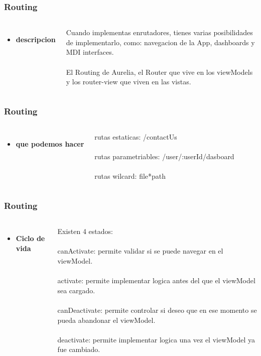 \documentclass{beamer}
\begin{document}
\begin{frame}
\frametitle{Routing}
\begin{columns}[c]
\begin{itemize}
\item \textbf{descripcion}
\end{itemize}

Cuando implementas enrutadores, tienes varias posibilidades de implementarlo, como: navegacion de la App, dashboards y MDI interfaces.
\\~\\
El Routing de Aurelia, el Router que vive en los viewModels y los router-view que viven en las vistas.
\end{columns}
\end{frame}
\begin{frame}
\frametitle{Routing}
\begin{columns}[c]
\begin{itemize}
\item \textbf{que podemos hacer}
\end{itemize}

rutas estaticas: /contactUs
\\~\\
rutas parametriables: /user/:userId/dasboard
\\~\\
rutas wilcard: file*path
\end{columns}
\end{frame}
\begin{frame}
\frametitle{Routing}
\begin{columns}[c]
\begin{itemize}
\item \textbf{Ciclo de vida}
\end{itemize}

Existen 4 estados:
\\~\\
canActivate: permite validar si se puede navegar en el viewModel.
\\~\\
activate: permite implementar logica antes del que el viewModel sea cargado.
\\~\\
canDeactivate: permite controlar si deseo que en ese momento se pueda abandonar el viewModel.
\\~\\
deactivate: permite implementar logica una vez el viewModel ya fue cambiado.
\end{columns}
\end{frame}
\end{document}
